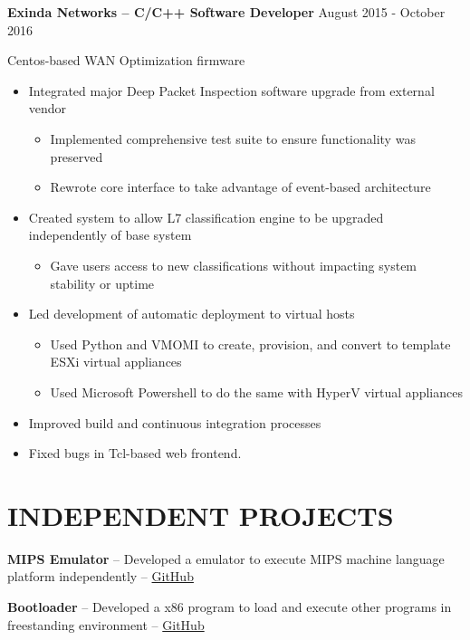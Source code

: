 \documentclass{res}
\begin{document}
\begin{resume}
         {\bf Exinda Networks -- C/C++ Software Developer} \hfill August 2015 - October 2016\vspace{-3mm}

         Centos-based WAN Optimization firmware
         \begin{itemize}
         \item Integrated major Deep Packet Inspection software upgrade from external vendor
           \begin{itemize}
           \item Implemented comprehensive test suite to ensure functionality was preserved
           \item Rewrote core interface to take advantage of event-based architecture
           \end{itemize}
         \item Created system to allow L7 classification engine to be upgraded independently of base system
           \begin{itemize}
           \item Gave users access to new classifications without impacting system stability or uptime
           \end{itemize}
         \item Led development of automatic deployment to virtual hosts
           \begin{itemize}
           \item Used Python and VMOMI to create, provision, and convert to template ESXi virtual appliances
           \item Used Microsoft Powershell to do the same with HyperV virtual appliances
           \end{itemize}
         \item Improved build and continuous integration processes
         \item Fixed bugs in Tcl-based web frontend.
         \end{itemize}

\section{INDEPENDENT PROJECTS}
  \vspace{3mm}
    {\bf MIPS Emulator} -- Developed a emulator to execute MIPS machine language platform independently --
    \href{https://github.com/joelwilliamson/MIPS-emulator}{GitHub}
    \vspace{-3mm}

    {\bf Bootloader} -- Developed a x86 program to load and execute other programs in freestanding environment --
    \href{https://github.com/joelwilliamson/AMD64/tree/master/barebones}{GitHub}
    \vspace{-3mm}


\end{resume}
\end{document}
